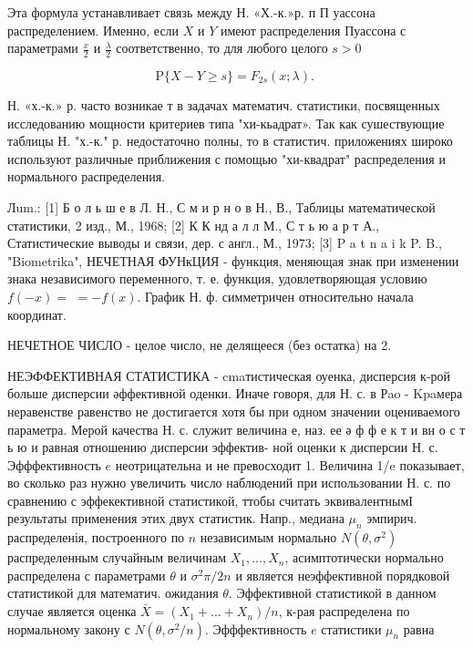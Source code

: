 \documentclass[10pt]{article}
\begin{document}
Эта формула устанавливает связь между Н. «Х.-к.»р. п П уассона распределением. Именно, если $X$ и $Y$ имеют распределения Пуассона с параметрами $\frac{x}{2}$ и $\frac{\lambda}{2}$ соответственно, то для любого целого $s>0$



\[

\mathrm{P}\{X-Y \geqslant s\}=F_{2 s}(x ; \lambda) \text {. }

\]



Н. «х.-к.» р. часто возникае т в задачах математич. статистики, посвященных исследованию мощности критериев типа "хи-кьадрат». Так как сушествующие таблицы Н. "х.-к." р. недостаточно полны, то в статистич. приложениях широко используют различные приближения с помощью "хи-квадрат" распределения и нормального распределения.



Лum.: [1] Б о л ь ш е в Л. Н., С м и р н о в Н., В., Таблицы математической статистики, 2 изд., М., 1968; [2] К К нд а л л М., С т ь ю а р т А., Статистические выводы и связи, дер. с англ., М., 1973; [3] P a t n a i k P. B., "Biometrika", НЕЧЕТНАЯ ФУНкЦИЯ - функция, меняющая знак при изменении знака независимого переменного, т. е. функция, удовлетворяющая условию $f(-x)=$ $=-f(x)$. График Н. ф. симметричен относительно начала координат.



НЕЧЕТНОЕ ЧИСЛО - целое число, не делящееся (без остатка) на 2.



НЕЭФФЕКТИВНАЯ СТАТИСТИКА - cmaтистическая оуенка, дисперсия к-рой больше дисперсии әффективной оденки. Иначе говоря, для Н. с. в Рao - Kpaмера неравенстве равенство не достигается хотя бы при одном значении оцениваемого параметра. Мерой качества Н. с. служит величина $е$, наз. ее ә ф ф е к т и вн о с т ь ю и равная отношению дисперсии эффектив- ной оценки к дисперсии Н. с. Эфффективность $e$ неотрицательна и не превосходит 1. Величина 1/e показывает, во сколько раз нужно увеличить число наблюдений при использовании Н. с. по сравнению с эффекективной статистикой, ттобы считать эквивалентнымІ результаты применения этих двух статистик. Напр., медиана $\mu_{n}$ эмпирич. распределенія, построенного по $n$ независимым нормально $N\left(\theta, \sigma^{2}\right)$ распределенным случайным величинам $X_{1}, \ldots, X_{n}$, асимптотически нормально распределена с параметрами $\theta$ и $\sigma^{2} \pi / 2 n$ и является неэффективной порядковой статистикой для математич. ожидания $\theta$. Эффективной статистикой в данном случае является оценка $\bar{X}=\left(X_{1}+\ldots+X_{n}\right) / n$, к-рая распределена по нормальному закону с $N\left(\theta, \sigma^{2} / n\right)$. Эфффективность $e$ статистики $\mu_{n}$ равна
\end{document}
